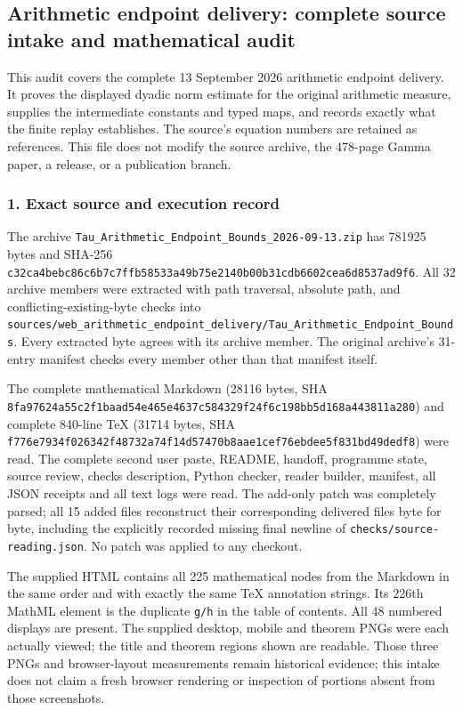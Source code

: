 \subsection{Arithmetic endpoint delivery: complete source intake and mathematical audit}\label{endpoint-arithmetic_intake--arithmetic-endpoint-delivery-complete-source-intake-and-mathematical-audit}

This audit covers the complete 13 September 2026 arithmetic endpoint delivery. It proves the displayed dyadic norm estimate for the original arithmetic measure, supplies the intermediate constants and typed maps, and records exactly what the finite replay establishes. The source's equation numbers are retained as references. This file does not modify the source archive, the 478-page Gamma paper, a release, or a publication branch.

\subsubsection{1. Exact source and execution record}\label{endpoint-arithmetic_intake--exact-source-and-execution-record}

The archive \texttt{Tau\_Arithmetic\_Endpoint\_Bounds\_2026-09-13.zip} has 781925 bytes and SHA-256 \texttt{c32ca4bebc86c6b7c7ffb58533a49b75e2140b00b31cdb6602cea6d8537ad9f6}. All 32 archive members were extracted with path traversal, absolute path, and conflicting-existing-byte checks into \texttt{sources/web\_arithmetic\_endpoint\_delivery/Tau\_Arithmetic\_Endpoint\_Bounds}. Every extracted byte agrees with its archive member. The original archive's 31-entry manifest checks every member other than that manifest itself.

The complete mathematical Markdown (28116 bytes, SHA \texttt{8fa97624a55c2f1baad54e465e4637c584329f24f6c198bb5d168a443811a280}) and complete 840-line TeX (31714 bytes, SHA \texttt{f776e7934f026342f48732a74f14d57470b8aae1cef76ebdee5f831bd49dedf8}) were read. The complete second user paste, README, handoff, programme state, source review, checks description, Python checker, reader builder, manifest, all JSON receipts and all text logs were read. The add-only patch was completely parsed; all 15 added files reconstruct their corresponding delivered files byte for byte, including the explicitly recorded missing final newline of \texttt{checks/source-reading.json}. No patch was applied to any checkout.

The supplied HTML contains all 225 mathematical nodes from the Markdown in the same order and with exactly the same TeX annotation strings. Its 226th MathML element is the duplicate \texttt{g/h} in the table of contents. All 48 numbered displays are present. The supplied desktop, mobile and theorem PNGs were each actually viewed; the title and theorem regions shown are readable. Those three PNGs and browser-layout measurements remain historical evidence; this intake does not claim a fresh browser rendering or inspection of portions absent from those screenshots.

